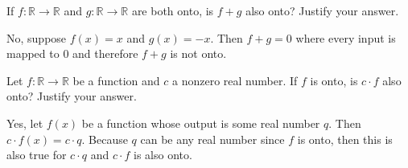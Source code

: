 \documentclass[12pt,letterpaper, onecolumn]{exam}
\begin{document}
\begin{questions}
\begin{solution}
	\end{solution}
	\setcounter{question}{30}\question If $f:\mathbb{R}\rightarrow\mathbb{R}$ and $g:\mathbb{R}\rightarrow\mathbb{R}$ are both onto, is $f+g$ also onto? Justify your answer.
	\begin{solution}
		No, suppose $f(x)=x$ and $g(x)=-x$. Then $f+g=0$ where every input is mapped to 0 and therefore $f+g$ is not onto.
	\end{solution}
		\setcounter{question}{32}\question Let $f:\mathbb{R}\rightarrow\mathbb{R}$ be a function and $c$ a nonzero real number. If $f$ is onto, is $c\cdot f$ also onto? Justify your answer.
		\begin{solution}
			Yes, let $f(x)$ be a function whose output is some real number $q$. Then $c\cdot f(x)=c\cdot q$.  Because $q$ can be any real number since $f$ is onto, then this is also true for $c\cdot q$ and $c\cdot f$ is also onto.
		\end{solution}
\end{questions}
\end{document}

